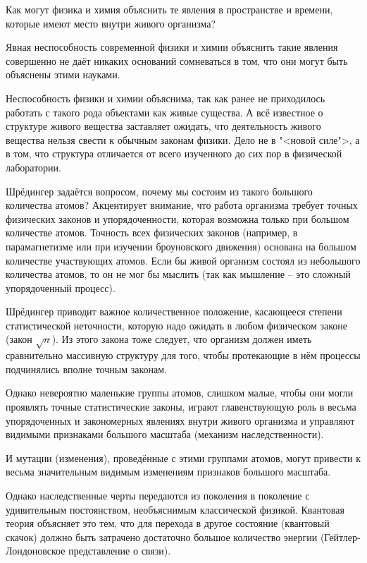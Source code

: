 \documentclass[exam_answers.tex]{subfiles}
\begin{document}
\renewcommand{\baselinestretch}{\blch}

Как могут физика и химия объяснить те явления в пространстве и времени, которые имеют место внутри живого организма?

Явная неспособность современной физики и химии объяснить такие явления совершенно не даёт никаких оснований сомневаться в том, что они могут быть объяснены этими науками.

Неспособность физики и химии объяснима, так как ранее не приходилось работать с такого рода объектами как живые существа. А всё известное о структуре живого вещества заставляет ожидать, что деятельность живого вещества нельзя свести к обычным законам физики. Дело не в "<новой силе">, а в том, что структура отличается от всего изученного до сих пор в физической лаборатории.

Шрёдингер задаётся вопросом, почему мы состоим из такого большого количества атомов? Акцентирует внимание, что работа организма требует точных физических законов и упорядоченности, которая возможна только при большом количестве атомов. Точность всех физических законов (например, в парамагнетизме или при изучении броуновского движения) основана на большом количестве участвующих атомов. Если бы живой организм состоял из небольшого количества атомов, то он не мог бы мыслить (так как мышление – это сложный упорядоченный процесс).

Шрёдингер приводит важное количественное положение, касающееся степени статистической неточности, которую надо ожидать в любом физическом законе (закон $\sqrt{n}$). Из этого закона тоже следует, что организм должен иметь сравнительно массивную структуру для того, чтобы протекающие в нём процессы подчинялись вполне точным законам.

Однако невероятно маленькие группы атомов, слишком малые, чтобы они могли проявлять точные статистические законы, играют главенствующую роль в весьма упорядоченных и закономерных явлениях внутри живого организма и управляют видимыми признаками большого масштаба (механизм наследственности).

И мутации (изменения), проведённые с этими группами атомов, могут привести к весьма значительным видимым изменениям признаков большого масштаба.

Однако наследственные черты передаются из поколения в поколение с удивительным постоянством, необъяснимым классической физикой. Квантовая теория объясняет это тем, что для перехода в другое состояние (квантовый скачок) должно быть затрачено достаточно большое количество энергии (Гейтлер-Лондоновское представление о связи).
\end{document}
